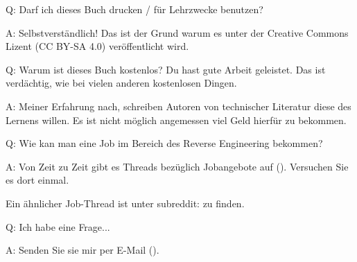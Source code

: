 \par Q: Darf ich dieses Buch drucken / für Lehrzwecke benutzen?
\par A: Selbstverständlich! Das ist der Grund warum es unter der Creative Commons Lizent (CC BY-SA 4.0) veröffentlicht wird.

\par Q: Warum ist dieses Buch kostenlos? Du hast gute Arbeit geleistet. Das ist verdächtig, wie bei vielen anderen kostenlosen Dingen.
\par A: Meiner Erfahrung nach, schreiben Autoren von technischer Literatur diese des Lernens willen. Es ist nicht möglich angemessen
viel Geld hierfür zu bekommen.

\par Q: Wie kan man eine Job im Bereich des Reverse Engineering bekommen?
\par A: Von Zeit zu Zeit gibt es Threads bezüglich Jobangebote auf \FNURLREDDIT{}
(\RedditHiringThread{}).
Versuchen Sie es dort einmal.

Ein ähnlicher Job-Thread ist unter subreddit: \NetsecHiringThread{} zu finden.

\par Q: Ich habe eine Frage...
\par A: Senden Sie sie mir per E-Mail (\EMAIL).
